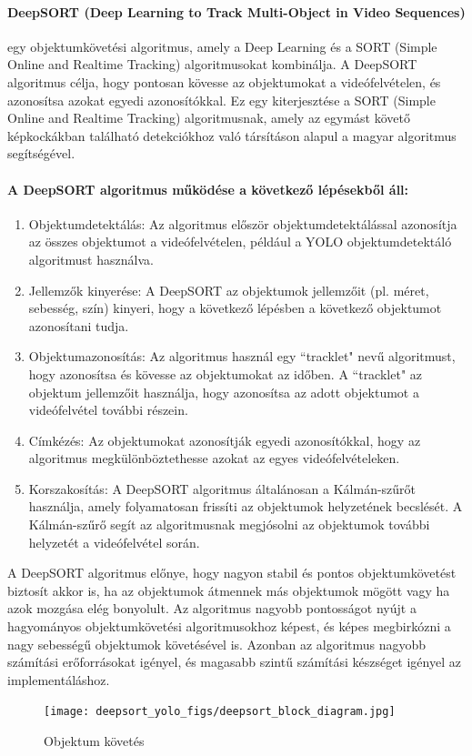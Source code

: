 \documentclass[12pt,a4paper]{article}
\begin{document}
\paragraph{DeepSORT (Deep Learning to Track Multi-Object in Video Sequences)} egy objektumkövetési algoritmus, amely a Deep Learning és a SORT (Simple Online and Realtime Tracking) algoritmusokat kombinálja. A DeepSORT algoritmus célja, hogy pontosan kövesse az objektumokat a videófelvételen, és azonosítsa azokat egyedi azonosítókkal.
Ez egy kiterjesztése a SORT (Simple Online and Realtime Tracking) algoritmusnak, amely az egymást követő képkockákban található detekciókhoz való társításon alapul a magyar algoritmus segítségével.
\paragraph{A DeepSORT algoritmus működése a következő lépésekből áll:}
\begin{enumerate}
    \item Objektumdetektálás: Az algoritmus először objektumdetektálással azonosítja az összes objektumot a videófelvételen, például a YOLO objektumdetektáló algoritmust használva.
    \item Jellemzők kinyerése: A DeepSORT az objektumok jellemzőit (pl. méret, sebesség, szín) kinyeri, hogy a következő lépésben a következő objektumot azonosítani tudja.
    \item Objektumazonosítás: Az algoritmus használ egy ``tracklet" nevű algoritmust, hogy azonosítsa és kövesse az objektumokat az időben. A ``tracklet" az objektum jellemzőit használja, hogy azonosítsa az adott objektumot a videófelvétel további részein.
    \item Címkézés: Az objektumokat azonosítják egyedi azonosítókkal, hogy az algoritmus megkülönböztethesse azokat az egyes videófelvételeken.
    \item Korszakosítás: A DeepSORT algoritmus általánosan a Kálmán-szűrőt használja, amely folyamatosan frissíti az objektumok helyzetének becslését. A Kálmán-szűrő segít az algoritmusnak megjósolni az objektumok további helyzetét a videófelvétel során.
\end{enumerate}
A DeepSORT algoritmus előnye, hogy nagyon stabil és pontos objektumkövetést biztosít akkor is, ha az objektumok átmennek más objektumok mögött vagy ha azok mozgása elég bonyolult. Az algoritmus nagyobb pontosságot nyújt a hagyományos objektumkövetési algoritmusokhoz képest, és képes megbirkózni a nagy sebességű objektumok követésével is. Azonban az algoritmus nagyobb számítási erőforrásokat igényel, és magasabb szintű számítási készséget igényel az implementáláshoz.
\begin{figure}
    \texttt{[image: deepsort\_yolo\_figs/deepsort\_block\_diagram.jpg]}
    \caption{Objektum követés}
    \label{ObjectTracking}
\end{figure}
\end{document}

